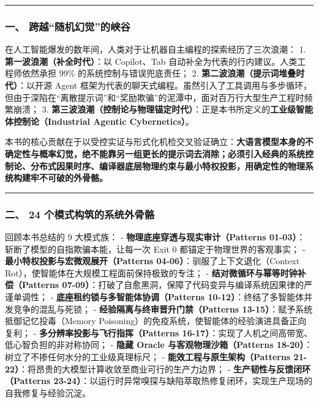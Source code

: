 \documentclass[
]{ctexart}
\renewcommand{\_}{\discretionary{}{}{\textunderscore}}
\begin{document}
\begin{center}\rule{0.5\linewidth}{0.5pt}\end{center}

\subsubsection{一、
跨越``随机幻觉''的峡谷}\label{ux4e00-ux8de8ux8d8aux968fux673aux5e7bux89c9ux7684ux5ce1ux8c37}

在人工智能爆发的数年间，人类对于让机器自主编程的探索经历了三次浪潮： 1.
\textbf{第一波浪潮（补全时代）}：以 Copilot、Tab
自动补全为代表的行内建议。人类工程师依然承担 99\%
的系统控制与错误兜底责任； 2.
\textbf{第二波浪潮（提示词堆叠时代）}：以开源 Agent
框架为代表的聊天式编程。虽然引入了工具调用与多步循环，但由于深陷在``离散提示词''和``奖励欺骗''的泥潭中，面对百万行大型生产工程时频繁崩溃；
3.
\textbf{第三波浪潮（控制论与物理锚定时代）}：正是本书所定义的\textbf{工业级智能体控制论（Industrial
Agentic Cybernetics）}。

本书的核心贡献在于以受控实证与形式化机检交叉验证确立：\textbf{大语言模型本身的不确定性与概率幻觉，绝不能靠另一组更长的提示词去消除；必须引入经典的系统控制论、分布式因果时序、编译器底层物理约束与最小特权投影，用确定性的物理系统构建牢不可破的外骨骼。}

\begin{center}\rule{0.5\linewidth}{0.5pt}\end{center}

\subsubsection{二、 24
个模式构筑的系统外骨骼}\label{ux4e8c-22-ux4e2aux6a21ux5f0fux6784ux7b51ux7684ux7cfbux7edfux5916ux9aa8ux9abc}

回顾本书总结的 9 大模式族： -
\textbf{物理底座穿透与现实审计（Patterns
01-03）}：斩断了模型的自指欺骗本能，让每一次 Exit 0
都锚定于物理世界的客观事实； -
\textbf{最小特权投影与宏微观展开（Patterns
04-06）}：驯服了上下文退化（Context
Rot），使智能体在大规模工程面前保持极致的专注； -
\textbf{结对微循环与幂等时钟补偿（Patterns
07-09）}：打破了自愈黑洞，保障了代码变异与编译系统因果律的严谨单调性； -
\textbf{底座租约锁与多智能体协调（Patterns
10-12）}：终结了多智能体并发竞争的混乱与死锁； -
\textbf{经验隔离与终审晋升门禁（Patterns
13-15）}：赋予系统抵御记忆投毒（Memory
Poisoning）的免疫系统，使智能体的经验演进具备正向复利； -
\textbf{多分辨率投影与飞行指挥（Patterns
16-17）}：实现了人机之间高带宽、低心智负担的非对称协同； - \textbf{隐藏
Oracle 与客观物理沙箱（Patterns
18-20）}：树立了不掺任何水分的工业级真理标尺； -
\textbf{能效工程与原生架构（Patterns
21-22）}：将昂贵的大模型计算收敛至商业可行的生产力边界； -
\textbf{生产韧性与反馈闭环（Patterns
23-24）}：以运行时异常嗅探与缺陷萃取热修复闭环，实现生产现场的自我修复与经验沉淀。
\end{document}
